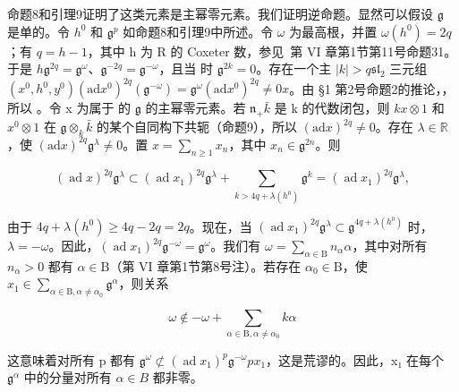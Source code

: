 命题8和引理9证明了这类元素是主幂零元素。我们证明逆命题。显然可以假设 \(\mathfrak{g}\) 是单的。令 \(h^0\) 和 \(\mathfrak{g}^p\) 如命题8和引理9中所述。令 \(\omega\) 为最高根，并置 \(\omega(h^0) = 2q\)；有 \(q = h - 1\)，其中 h 为 R 的 Coxeter 数，参见~第 VI 章第1节第11号命题31。于是 \(h\)\(\mathfrak{g}^{2q} = \mathfrak{g}^\omega\)、\(\mathfrak{g}^{-2q} = \mathfrak{g}^{-\omega}\)，且当  时 \(\mathfrak{g}^{2k} = 0\)。存在一个主 \(|k| > q\)\(\mathfrak{sl}_2\) 三元组 \((x^0, h^0, y^0)\)\((\mathrm{ad} x^0)^{2q}(\mathfrak{g}^{-\omega}) = \mathfrak{g}^\omega\)\((\mathrm{ad} x^0)^{2q} \neq 0\)\(x\)。由 §1 第2号命题2的推论，，所以 。令 x 为属于  的 \(\mathfrak{g}\) 的主幂零元素。若 \(\mathfrak{n}_+\)\(\bar{k}\) 是 k 的代数闭包，则 \(k\)\(x \otimes 1\) 和 \(x^0 \otimes 1\) 在 \(\mathfrak{g} \otimes_k \bar{k}\) 的某个自同构下共轭（命题9），所以 \((\mathrm{ad} x)^{2q} \neq 0\)。存在 \(\lambda \in \mathbb{R}\)，使 \((\mathrm{ad} x)^{2q} \mathfrak{g}^\lambda \neq 0\)。置 \(x = \sum_{n \geq 1} x_n\)，其中 \(x_n \in \mathfrak{g}^{2n}\)。则

\[
(\operatorname{ad} x) ^ {2 q} \mathfrak {g} ^ {\lambda} \subset (\operatorname{ad} x _ {1}) ^ {2 q} \mathfrak {g} ^ {\lambda} + \sum_ {k > 4 q + \lambda (h ^ {0})} \mathfrak {g} ^ {k} = (\operatorname{ad} x _ {1}) ^ {2 q} \mathfrak {g} ^ {\lambda},
\]

由于 \(4q + \lambda(h^0) \geq 4q - 2q = 2q\)。现在，当 \((\operatorname{ad} x_1)^{2q} \mathfrak{g}^\lambda \subset \mathfrak{g}^{4q + \lambda(h^0)}\) 时，\(\lambda = -\omega\)。因此，\((\operatorname{ad} x_1)^{2q} \mathfrak{g}^{-\omega} = \mathfrak{g}^\omega\)。我们有 \(\omega = \sum_{\alpha \in \mathrm{B}} n_\alpha \alpha\)，其中对所有 \(n_\alpha > 0\) 都有 \(\alpha \in \mathrm{B}\)（第 VI 章第1节第8号注）。若存在 \(\alpha_0 \in \mathrm{B}\)，使 \(x_1 \in \sum_{\alpha \in \mathrm{B}, \alpha \neq \alpha_0} \mathfrak{g}^\alpha\)，则关系

\[
\omega \notin - \omega + \sum_ {\alpha \in \mathrm{B}, \alpha \neq \alpha_ {0}} k \alpha
\]

这意味着对所有 p 都有 \(\mathfrak{g}^{\omega} \not\subset (\operatorname{ad} x_1)^p \mathfrak{g}^{-\omega}\)\(p\)\(x_1\)，这是荒谬的。因此，x₁ 在每个 \(\mathfrak{g}^{\alpha}\) 中的分量对所有 \(\alpha \in B\) 都非零。

